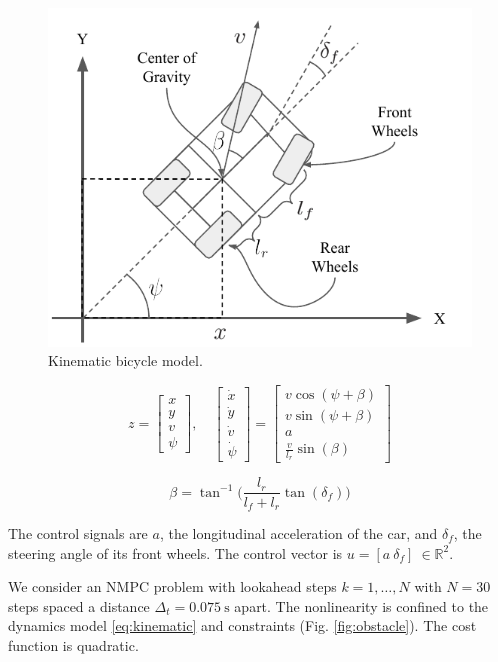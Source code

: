 \documentclass[letterpaper, 10 pt, conference]{ieeeconf}  %
\begin{document}
 \begin{figure}[htbp]
 	\centering
 	\includegraphics[width=0.8\linewidth]{figures/kinematic_diagram.pdf}
 	\caption{Kinematic bicycle model.}
 	\label{fig:kinematic}
 \end{figure}
 

 \begin{equation}
 z = \begin{bmatrix}
 x\\y\\v\\\psi
 \end{bmatrix},\quad \begin{bmatrix}
 \dot x\\\dot y\\\dot v\\\dot\psi
 \end{bmatrix} = \begin{bmatrix}
 v\cos(\psi + \beta)\\
 v\sin(\psi + \beta)\\
 a\\
 \frac{v}{l_r}\sin(\beta)
 \end{bmatrix}
 \label{eq:kinematic}
 \end{equation}
 
 \begin{equation}
 \beta = \tan^{-1}\Big( \frac{l_r}{l_f + l_r}\tan(\delta_f) \Big)
 \label{eq:beta}
 \end{equation}
 
 The control signals are $a$, the longitudinal acceleration of the car, and $\delta_f$, the steering angle of its front wheels. The control vector is $u = [a\ \delta_f]\ \in \mathbb{R}^2$.
 
 We consider an NMPC problem with lookahead steps $k=1,\dots,N$ with $N=30$ steps spaced a distance $\Delta_t = 0.075\ \text{s}$ apart. The nonlinearity is confined to the dynamics model \eqref{eq:kinematic} and constraints (Fig. \ref{fig:obstacle}). The cost function is quadratic.
 
\end{document}
